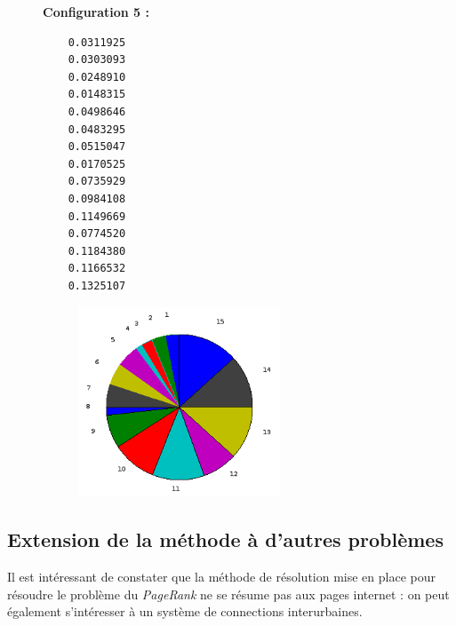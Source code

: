 \documentclass[a4paper,10pt]{report}
\begin{document}
\begin{figure}[H]
\begin{minipage}[c]{.40\linewidth}
\noindent \textbf{Configuration 5 :}
\begin{verbatim}
    0.0311925  
    0.0303093  
    0.0248910  
    0.0148315  
    0.0498646  
    0.0483295  
    0.0515047  
    0.0170525  
    0.0735929  
    0.0984108  
    0.1149669  
    0.0774520  
    0.1184380  
    0.1166532  
    0.1325107
\end{verbatim}
\end{minipage} \hfill
\begin{minipage}[c]{.58\linewidth}
\begin{figure}[H]
   \includegraphics[width=6cm]{diag_config5.png}
   \end{figure}
\end{minipage}
\end{figure}

\newpage
\subsection{Extension de la méthode à d'autres problèmes}
Il est intéressant de constater que la méthode de résolution mise en place pour résoudre le problème du \textit{PageRank} ne se résume pas aux pages internet : on peut également s'intéresser à un système de connections interurbaines.\\ \\
\end{document}
